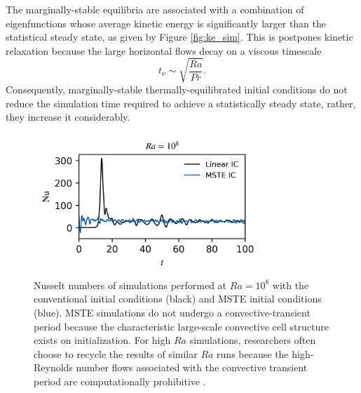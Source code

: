 \documentclass[reprint,amsmath,amssymb,aps]{revtex4-1}
\begin{document}
The marginally-stable equilibria are associated with a combination of eigenfunctions whose average kinetic energy is significantly larger than the statistical steady state, as given by Figure \ref{fig:ke_sim}. 
This is postpones kinetic relaxation because the large horizontal flows decay on a viscous timescale
\begin{equation}
    t_{\nu} \sim \sqrt{\frac{Ra}{Pr}}. \nonumber
\end{equation}
Consequently, marginally-stable thermally-equilibrated initial conditions do not reduce the simulation time required to achieve a statistically steady state, rather, they increase it considerably.
\begin{figure}
    \begin{minipage}{3.4in}
        \centering
        \includegraphics[width=3.4in]{sim_eq_nu.png}
        \caption{Nusselt numbers of simulations performed at $Ra = 10^8$ with the conventional initial conditions (black) and MSTE initial conditions (blue). 
        MSTE simulations do not undergo a convective-transient period because the characteristic large-scale convective cell structure exists on initialization. For high $Ra$ simulations, researchers often choose to recycle the results of similar $Ra$ runs \cite{Verzicco, Johnston} because the high-Reynolds number flows associated with the convective transient period are computationally prohibitive \cite{Anders_AE}.}
        \label{fig:nu_sim}
    \end{minipage}
\end{figure}
\end{document}
